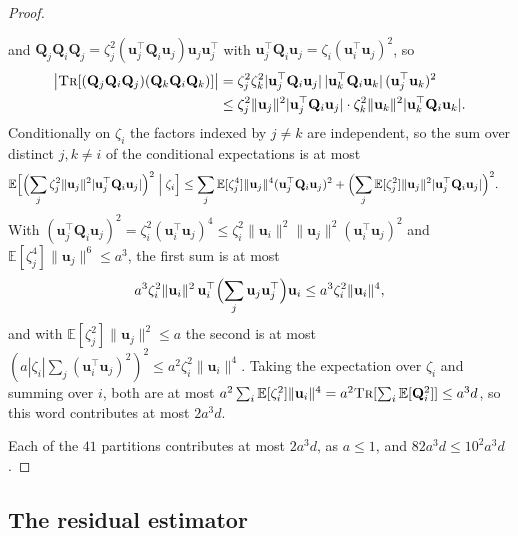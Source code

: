 \documentclass[11pt]{article}
\theoremstyle{remark}
\newcommand{\QQ}{\mathbf Q}
\newcommand{\uu}{\mathbf u}
\newcommand{\Ex}{\mathbb E}
\newcommand{\norm}[1]{\lVert#1\rVert}
\newcommand{\tr}{\textsc{Tr}}
\begin{document}
\begin{proof}
\begin{itemize}[leftmargin=*,itemsep=1pt]
and $\QQ_j\QQ_i\QQ_j=\zeta_j^{2}(\uu_j^{\top}\QQ_i\uu_j)\uu_j\uu_j^{\top}$ with
$\uu_j^{\top}\QQ_i\uu_j=\zeta_i(\uu_i^{\top}\uu_j)^{2}$, so
\begin{align*}
\bigl|\tr[(\QQ_j\QQ_i\QQ_j)(\QQ_k\QQ_i\QQ_k)]\bigr|
&=\zeta_j^{2}\zeta_k^{2}|\uu_j^{\top}\QQ_i\uu_j|\,|\uu_k^{\top}\QQ_i\uu_k|\,(\uu_j^{\top}\uu_k)^{2}\\
&\le\zeta_j^{2}\norm{\uu_j}^{2}|\uu_j^{\top}\QQ_i\uu_j|\cdot\zeta_k^{2}\norm{\uu_k}^{2}|\uu_k^{\top}\QQ_i\uu_k| .
\end{align*}
Conditionally on $\zeta_i$ the factors indexed by $j\neq k$ are
independent, so the sum over distinct $j,k\neq i$ of the conditional
expectations is at most
\begin{align*}
\Ex\Bigl[\Bigl(\sum_{j}\zeta_j^{2}\norm{\uu_j}^{2}|\uu_j^{\top}\QQ_i\uu_j|\Bigr)^{2}\Bigm|\zeta_i\Bigr]
&\le\sum_j\Ex[\zeta_j^{4}]\norm{\uu_j}^{4}(\uu_j^{\top}\QQ_i\uu_j)^{2}
+\Bigl(\sum_j\Ex[\zeta_j^{2}]\norm{\uu_j}^{2}|\uu_j^{\top}\QQ_i\uu_j|\Bigr)^{2}.
\end{align*}
With $(\uu_j^{\top}\QQ_i\uu_j)^{2}=\zeta_i^{2}(\uu_i^{\top}\uu_j)^{4}\le\zeta_i^{2}\norm{\uu_i}^{2}\norm{\uu_j}^{2}(\uu_i^{\top}\uu_j)^{2}$
and $\Ex[\zeta_j^{4}]\norm{\uu_j}^{6}\le a^{3}$, the first sum is at most
\[
a^{3}\zeta_i^{2}\norm{\uu_i}^{2}\,\uu_i^{\top}\Bigl(\sum_j\uu_j\uu_j^{\top}\Bigr)\uu_i
\le a^{3}\zeta_i^{2}\norm{\uu_i}^{4},
\]
and with $\Ex[\zeta_j^{2}]\norm{\uu_j}^{2}\le a$ the second is at most
$(a|\zeta_i|\sum_j(\uu_i^{\top}\uu_j)^{2})^{2}\le a^{2}\zeta_i^{2}\norm{\uu_i}^{4}$.
Taking the expectation over $\zeta_i$ and summing over $i$, both are at
most $a^{2}\sum_i\Ex[\zeta_i^{2}]\norm{\uu_i}^{4}=a^{2}\tr[\sum_i\Ex[\QQ_i^{2}]]\le a^{3}d$,
so this word contributes at most $2a^{3}d$.
\end{itemize}
Each of the $41$ partitions contributes at most $2a^{3}d$, as $a\le1$, and
$82a^{3}d\le10^{2}a^{3}d$.
\end{proof}

\subsection{The residual estimator}
\end{document}

